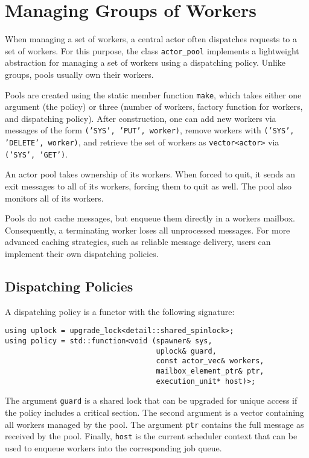 \section{Managing Groups of Workers \experimental}
\label{worker-groups}

When managing a set of workers, a central actor often dispatches requests to a
set of workers. For this purpose, the class \lstinline^actor_pool^ implements a
lightweight abstraction for managing a set of workers using a dispatching
policy. Unlike groups, pools usually own their workers.

Pools are created using the static member function \lstinline^make^, which
takes either one argument (the policy) or three (number of workers, factory
function for workers, and dispatching policy). After construction, one can add
new workers via messages of the form \texttt{('SYS', 'PUT', worker)}, remove
workers with \texttt{('SYS', 'DELETE', worker)}, and retrieve the set of
workers as \lstinline^vector<actor>^ via \texttt{('SYS', 'GET')}.

An actor pool takes ownership of its workers. When forced to quit, it sends an
exit messages to all of its workers, forcing them to quit as well. The pool
also monitors all of its workers.

Pools do not cache messages, but enqueue them directly in a workers mailbox.
Consequently, a terminating worker loses all unprocessed messages. For more
advanced caching strategies, such as reliable message delivery, users can
implement their own dispatching policies.

\subsection{Dispatching Policies}

A dispatching policy is a functor with the following signature:

\begin{lstlisting}
using uplock = upgrade_lock<detail::shared_spinlock>;
using policy = std::function<void (spawner& sys,
                                   uplock& guard,
                                   const actor_vec& workers,
                                   mailbox_element_ptr& ptr,
                                   execution_unit* host)>;
\end{lstlisting}

The argument \lstinline^guard^ is a shared lock that can be upgraded for unique
access if the policy includes a critical section. The second argument is a
vector containing all workers managed by the pool. The argument \lstinline^ptr^
contains the full message as received by the pool. Finally, \lstinline^host^ is
the current scheduler context that can be used to enqueue workers into the
corresponding job queue.

